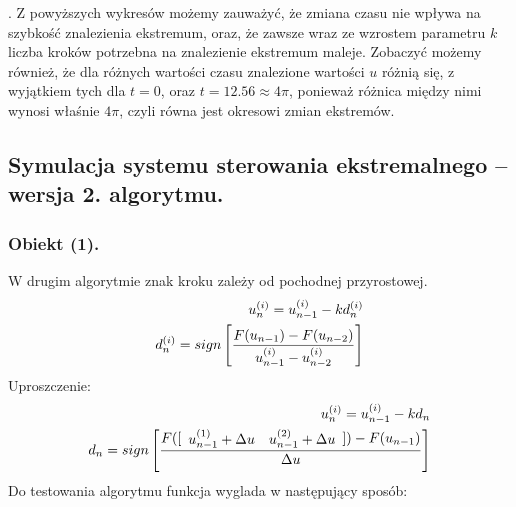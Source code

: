\documentclass[a4paper,10pt]{article}
\begin{document}
\newpage . \newpage Z powyższych wykresów możemy zauważyć, że zmiana czasu nie wpływa na szybkość znalezienia ekstremum, oraz, że zawsze wraz ze wzrostem parametru $k$ liczba kroków potrzebna na znalezienie ekstremum maleje. Zobaczyć możemy również, że dla różnych wartości czasu znalezione wartości $u$ różnią się, z wyjątkiem tych dla $t=0$, oraz $t=12.56 \approx 4\pi$, ponieważ różnica między nimi wynosi właśnie $4\pi$, czyli równa jest okresowi zmian ekstremów.

\subsection{Symulacja systemu sterowania ekstremalnego – wersja 2. algorytmu.}

\subsubsection{Obiekt (1).}
W drugim algorytmie znak kroku zależy od pochodnej przyrostowej.
\begin{eqnarray}
	u_n^{(i)} = u_{n-1}^{(i)}-kd_n^{(i)}\\
	d_n^{(i)} = sign \left[ {F(u_{n-1}) - F(u_{n-2}) \over u_{n-1}^{(i)} - u_{n-2}^{(i)}} \right] 
\end{eqnarray}
Uproszczenie:
\begin{eqnarray}
	u_n^{(i)} = u_{n-1}^{(i)}-kd_n\\
	d_n = sign \left[ {F([\begin{array}{ll} u_{n-1}^{(1)} + \Delta u & u_{n-1}^{(2)} + \Delta u\end{array}]) - F(u_{n-1}) \over \Delta u}\right] 
\end{eqnarray}
Do testowania algorytmu funkcja wyglada w następujący sposób:


\end{document}
